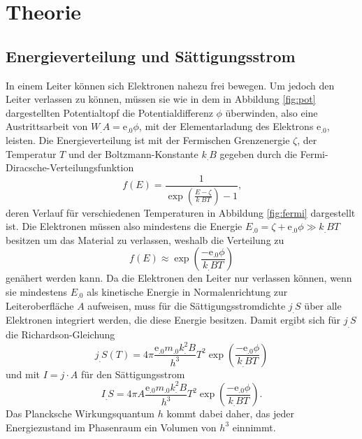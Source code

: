 \section{Theorie}
\label{sec:Theorie}

\subsection{Energieverteilung und Sättigungsstrom}

In einem Leiter können sich Elektronen nahezu frei bewegen. Um jedoch den Leiter verlassen zu können, müssen sie wie in dem in Abbildung \ref{fig:pot} dargestellten Potentialtopf die Potentialdifferenz $\phi$ überwinden, also eine Austrittsarbeit von $W_.A=\mathrm{e}_.0\phi$, mit der Elementarladung des Elektrons $\mathrm{e}_.0$, leisten. \newline
Die Energieverteilung ist mit der Fermischen Grenzenergie $\zeta$, der Temperatur $T$ und der Boltzmann-Konstante $k_.B$ gegeben durch die Fermi-Diracsche-Verteilungsfunktion
\[
f(E)= \frac{1}{\exp{\left(\frac{E-\zeta}{k_.BT}\right)}-1}\text{,}
\]
deren Verlauf für verschiedenen Temperaturen in Abbildung \ref{fig:fermi} dargestellt ist.
Die Elektronen müssen also mindestens die Energie $E_.0=\zeta + \mathrm{e}_.0\phi\gg k_.BT$ besitzen um das Material zu verlassen, weshalb die Verteilung zu 
\begin{equation}
f(E)\approx\exp{\left(\frac{-\mathrm{e}_.0\phi}{k_.BT}\right)}\label{eq:FDV}
\end{equation}
genähert werden kann. Da die Elektronen den Leiter nur verlassen können, wenn sie mindestens $E_.0$ als kinetische Energie in Normalenrichtung zur Leiteroberfläche $A$ aufweisen, muss für die Sättigungsstromdichte $j_.S$ über alle Elektronen integriert werden, die diese Energie besitzen. Damit ergibt sich für $j_.S$ die Richardson-Gleichung
\[
j_.S(T)=4\pi\frac{\mathrm{e}_.0m_.0k^2_.B}{h^3}T^2\exp{\left(\frac{-\mathrm{e}_.0\phi}{k_.BT}\right)}
\]
und mit $I=j\cdot A$ für den Sättigungsstrom 
\begin{equation}
I_.S = 4\pi A\frac{\mathrm{e}_.0m_.0k^2_.B}{h^3}T^2\exp{\left(\frac{-\mathrm{e}_.0\phi}{k_.BT}\right)}\text{.}
\end{equation}
Das Plancksche Wirkungsquantum $h$ kommt dabei daher, das jeder Energiezustand im Phasenraum ein Volumen von $h^3$ einnimmt.

